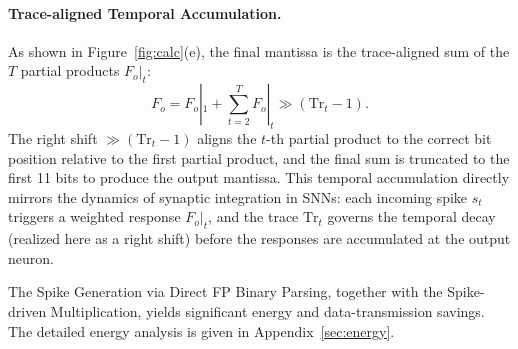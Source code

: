 \paragraph{Trace-aligned Temporal Accumulation.}
As shown in Figure~\ref{fig:calc}(e), the final mantissa is the trace-aligned sum of the $T$ partial products $F_{o}|_t$: 
\begin{equation}\label{eq:temporal_accum}
F_o = F_{o}|_1 + \sum_{t=2}^{T} F_{o}|_t \gg (\mathrm{Tr}_t - 1).
\end{equation}
The right shift $\gg (\mathrm{Tr}_t - 1)$ aligns the $t$-th partial product to the correct bit position relative to the first partial product, and the final sum is truncated to the first 11 bits to produce the output mantissa. This temporal accumulation directly mirrors the dynamics of synaptic integration in SNNs: each incoming spike $s_t$ triggers a weighted response $F_{o}|_t$, and the trace $\mathrm{Tr}_t$ governs the temporal decay (realized here as a right shift) before the responses are accumulated at the output neuron. 

The Spike Generation via Direct FP Binary Parsing, together with the Spike-driven Multiplication, yields significant energy and data-transmission savings. The detailed energy analysis is given in Appendix~\ref{sec:energy}.



